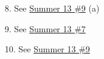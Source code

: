 \begin{itemize}
	\item[8.] See \hyperref[q:s13-9]{Summer 13 \#9} (a)
	\item[9.] See \hyperref[q:s13-7]{Summer 13 \#7}
	\item[10.] See \hyperref[q:s13-9]{Summer 13 \#9}
\end{itemize}